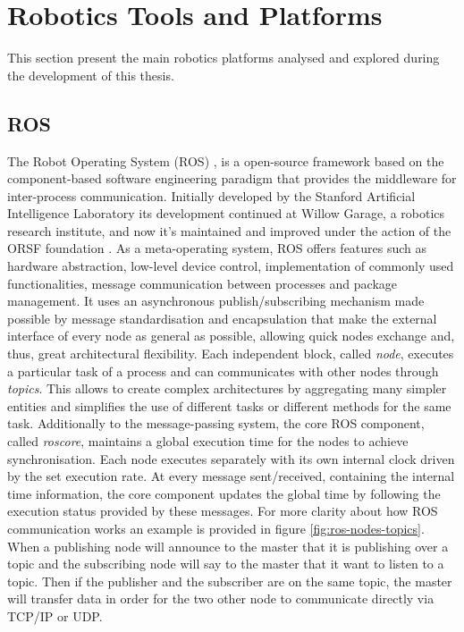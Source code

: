 \section{Robotics Tools and Platforms} \label{sec:Robotics-Tools-and-Platforms}
This section present the main robotics platforms analysed and explored during the development of this thesis.

\subsection{ROS}
The Robot Operating System (ROS) \cite{ROS}, is a open-source framework based on the component-based software engineering paradigm that provides the middleware for inter-process communication. Initially developed by the Stanford  Artificial Intelligence Laboratory its development continued at Willow Garage, a robotics research institute, and now it's maintained and improved under the action of the ORSF foundation \cite{ROS}. As a meta-operating system, ROS offers features such as hardware abstraction, low-level device control, implementation of commonly used functionalities, message communication between processes and package management. It uses an asynchronous publish/subscribing mechanism made possible by message standardisation and encapsulation that make the external interface of every node as general as possible, allowing quick nodes exchange and, thus, great architectural flexibility. Each independent block, called \textit{node}, executes a particular task of a process and can communicates with other nodes through \textit{topics}. This allows to create complex architectures by aggregating many simpler entities and simplifies the use of different tasks  or different methods for the same task. Additionally to the message-passing system, the core ROS component, called \textit{roscore}, maintains a global execution time for the nodes to achieve synchronisation. Each node executes separately with its own internal clock driven by the set execution rate. At every message sent/received, containing the internal time information, the core component updates the global time by following the execution status provided by these messages.
For more clarity about how ROS communication works an example is provided in figure \ref{fig:ros-nodes-topics}. When a publishing node will announce to the master that it is publishing over a topic and the subscribing node will say to the master that it want to listen to a topic. Then if the publisher
and the subscriber are on the same topic, the master will transfer data in order for the two other node to communicate directly via TCP/IP or UDP.

